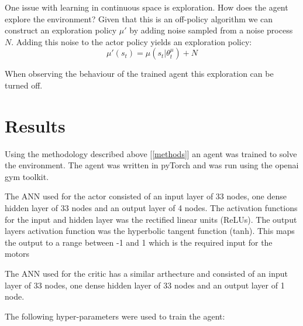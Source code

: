 \documentclass[12pt]{article}
\begin{document}
One issue with learning in continuous space is exploration.
How does the agent explore the environment?
Given that this is an off-policy algorithm we can construct an exploration policy $\mu'$ by adding noise sampled from a noise process $N$.
Adding this noise to the actor policy yields an exploration policy:
$$\mu'(s_t) = \mu(s_t|\theta_t^\mu) + N$$

When observing the behaviour of the trained agent this exploration can be turned off.

\section{Results}
Using the methodology described above [\ref{methods}] an agent was trained to solve the environment.
The agent was written in pyTorch and was run using the openai gym toolkit.

The ANN used for the actor consisted of an input layer of 33 nodes, one dense hidden layer of 33 nodes and an output layer of 4 nodes.
The activation functions for the input and hidden layer was the rectified linear units (ReLUs). 
The output layers activation function was the hyperbolic tangent function (tanh). 
This maps the output to a range between -1 and 1 which is the required input for the motors

The ANN used for the critic has a similar arthecture and consisted of an input layer of 33 nodes, one dense hidden layer of 33 nodes and an output layer of 1 node.

The following hyper-parameters were used to train the agent:
\end{document}
